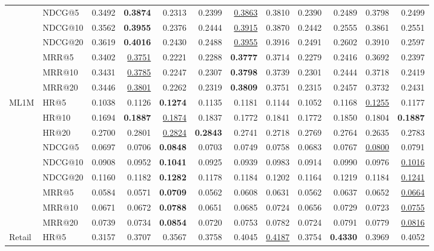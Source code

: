 \begin{tabular}{llrrrrrrrrrr}
 & NDCG@5 & 0.3492 & \textbf{0.3874} & 0.2313 & 0.2399 & \underline{0.3863} & 0.3810 & 0.2390 & 0.2489 & 0.3798 & 0.2499 \\
 & NDCG@10 & 0.3562 & \textbf{0.3955} & 0.2376 & 0.2444 & \underline{0.3915} & 0.3870 & 0.2442 & 0.2555 & 0.3861 & 0.2551 \\
 & NDCG@20 & 0.3619 & \textbf{0.4016} & 0.2430 & 0.2488 & \underline{0.3955} & 0.3916 & 0.2491 & 0.2602 & 0.3910 & 0.2597 \\
 & MRR@5 & 0.3402 & \underline{0.3751} & 0.2221 & 0.2288 & \textbf{0.3777} & 0.3714 & 0.2279 & 0.2416 & 0.3692 & 0.2397 \\
 & MRR@10 & 0.3431 & \underline{0.3785} & 0.2247 & 0.2307 & \textbf{0.3798} & 0.3739 & 0.2301 & 0.2444 & 0.3718 & 0.2419 \\
 & MRR@20 & 0.3446 & \underline{0.3801} & 0.2262 & 0.2319 & \textbf{0.3809} & 0.3751 & 0.2315 & 0.2457 & 0.3732 & 0.2431 \\
\hline
ML1M & HR@5 & 0.1038 & 0.1126 & \textbf{0.1274} & 0.1135 & 0.1181 & 0.1144 & 0.1052 & 0.1168 & \underline{0.1255} & 0.1177 \\
 & HR@10 & 0.1694 & \textbf{0.1887} & \underline{0.1874} & 0.1837 & 0.1772 & 0.1841 & 0.1772 & 0.1850 & 0.1804 & \textbf{0.1887} \\
 & HR@20 & 0.2700 & 0.2801 & \underline{0.2824} & \textbf{0.2843} & 0.2741 & 0.2718 & 0.2769 & 0.2764 & 0.2635 & 0.2783 \\
 & NDCG@5 & 0.0697 & 0.0706 & \textbf{0.0848} & 0.0703 & 0.0749 & 0.0758 & 0.0683 & 0.0767 & \underline{0.0800} & 0.0791 \\
 & NDCG@10 & 0.0908 & 0.0952 & \textbf{0.1041} & 0.0925 & 0.0939 & 0.0983 & 0.0914 & 0.0990 & 0.0976 & \underline{0.1016} \\
 & NDCG@20 & 0.1160 & 0.1182 & \textbf{0.1282} & 0.1178 & 0.1184 & 0.1202 & 0.1164 & 0.1219 & 0.1184 & \underline{0.1241} \\
 & MRR@5 & 0.0584 & 0.0571 & \textbf{0.0709} & 0.0562 & 0.0608 & 0.0631 & 0.0562 & 0.0637 & 0.0652 & \underline{0.0664} \\
 & MRR@10 & 0.0671 & 0.0672 & \textbf{0.0788} & 0.0651 & 0.0685 & 0.0724 & 0.0656 & 0.0729 & 0.0723 & \underline{0.0755} \\
 & MRR@20 & 0.0739 & 0.0734 & \textbf{0.0854} & 0.0720 & 0.0753 & 0.0782 & 0.0724 & 0.0791 & 0.0779 & \underline{0.0816} \\
\hline
Retail & HR@5 & 0.3157 & 0.3707 & 0.3567 & 0.3758 & 0.4045 & \underline{0.4187} & 0.3754 & \textbf{0.4330} & 0.3969 & 0.4052 \\

\end{tabular}
